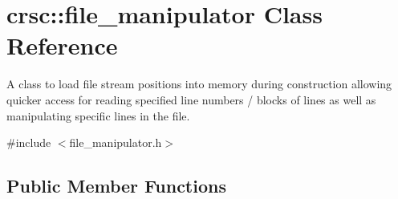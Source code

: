 \hypertarget{classcrsc_1_1file__manipulator}{}\section{crsc\+:\+:file\+\_\+manipulator Class Reference}
\label{classcrsc_1_1file__manipulator}


A class to load file stream positions into memory during construction allowing quicker access for reading specified line numbers / blocks of lines as well as manipulating specific lines in the file.  




{\ttfamily \#include $<$file\+\_\+manipulator.\+h$>$}

\subsection*{Public Member Functions}
